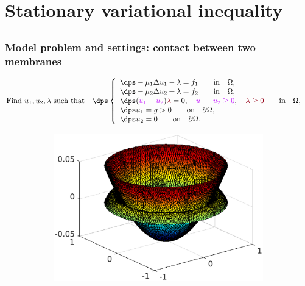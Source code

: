 \documentclass[aspectratio=169]{beamer}
\begin{document}
\section{Stationary variational inequality}
\subsection{}
\begin{frame}
\frametitle{Model problem and settings: contact between two membranes}
\vspace{-1.7 cm}
\begin{equation*}
\mbox{Find} \ u_1, u_2, \lambda \ \mbox{such that} \quad
\dps
\left\lbrace\begin{array}{llccc}
\dps -\mu_1 \Delta u_1-\lambda = f_1 \qquad \mbox{in} \quad \Omega, \\
\dps -\mu_2 \Delta u_2+\lambda = f_2 \qquad \mbox{in} \quad \Omega,\\
\dps (\textcolor{electricpurple}{u_1-u_2})\textcolor{carmine}{\lambda}=0, \quad \textcolor{electricpurple}{u_1-u_2 \geq 0}, \quad 
\textcolor{carmine}{\lambda \geq 0} \qquad \mbox{in} \quad \Omega, \hspace{0.2 cm}\\
\dps u_1=g > 0 \qquad \mbox{on} \quad\partial \Omega,\\
\dps u_2=0 \qquad \mbox{on} \quad\partial \Omega.
\end{array}
\right.
\end{equation*}
\vspace{-0.8 cm}
\begin{figure}[t]
\begin{subfigure}[normal]{0.44\textwidth} 
\includegraphics[width=\textwidth]{fig_article_chap_1/fig_membrane_cv.eps}    

\end{subfigure}
\end{figure}
\end{frame}
\end{document}
